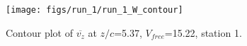 \begin{figure}[H]
\centering
\texttt{[image: figs/run\_1/run\_1\_W\_contour]}
\caption{Contour plot of $\overline{v_{z}}$ at $z/c$=5.37, $V_{free}$=15.22, station 1.}
\label{fig:run_1_W_contour}
\end{figure}


